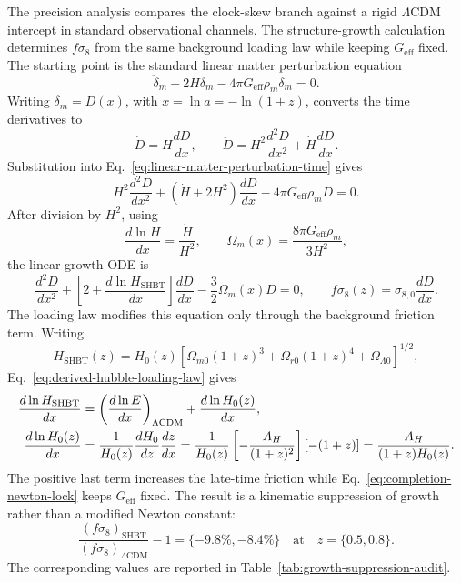 \documentclass[11pt,letterpaper]{article}
\theoremstyle{plain}
\newcommand{\lcdm}{\ensuremath{\Lambda\mathrm{CDM}}}
\newcommand{\AH}{A_H}
\begin{document}
The precision analysis compares the clock-skew branch against a rigid
\lcdm{} intercept in standard observational channels.  The structure-growth
calculation determines \(f\sigma_8\) from the same background loading law while keeping
\(G_{\text{eff}}\) fixed.  The starting point is the standard linear matter
perturbation equation
\begin{equation}
\label{eq:linear-matter-perturbation-time}
 \ddot\delta_m+2H\dot\delta_m
 -4\pi G_{\text{eff}}\rho_m\delta_m=0.
\end{equation}
Writing \(\delta_m=D(x)\), with \(x=\ln a=-\ln(1+z)\), converts the time
derivatives to
\begin{equation}
\label{eq:growth-time-derivative-conversion}
 \dot D
 =
 H\frac{dD}{dx},
 \qquad
 \ddot D
 =
 H^2\frac{d^2D}{dx^2}
 +
 \dot H\frac{dD}{dx}.
\end{equation}
Substitution into Eq.~\eqref{eq:linear-matter-perturbation-time} gives
\begin{equation}
\label{eq:growth-before-omega-substitution}
 H^2\frac{d^2D}{dx^2}
 +
 \left(\dot H+2H^2\right)\frac{dD}{dx}
 -
 4\pi G_{\text{eff}}\rho_mD
 =
 0.
\end{equation}
After division by \(H^2\), using
\[
 \frac{d\ln H}{dx}=\frac{\dot H}{H^2},
 \qquad
 \Omega_m(x)=\frac{8\pi G_{\text{eff}}\rho_m}{3H^2},
\]
the linear growth ODE is
\begin{equation}
\label{eq:growth-equation-loading}
 \boxed{
 \frac{d^2D}{dx^2}
 +
 \left[
  2+\frac{d\ln H_{\text{SHBT}}}{dx}
 \right]
 \frac{dD}{dx}
 -
 \frac{3}{2}\Omega_m(x)D
 =
 0,
 \qquad
 f\sigma_8(z)=\sigma_{8,0}\frac{dD}{dx}.
 }
\end{equation}
The loading law modifies this equation only through the background friction
term.  Writing
\begin{equation}
\label{eq:loaded-background-hubble}
 H_{\text{SHBT}}(z)
 =
 H_0(z)
 \left[
 \Omega_{m0}(1+z)^3+\Omega_{r0}(1+z)^4+\Omega_{\Lambda0}
 \right]^{1/2},
\end{equation}
Eq.~\eqref{eq:derived-hubble-loading-law} gives
\begin{align}
\label{eq:growth-friction-shift}
 \frac{d\ln H_{\text{SHBT}}}{dx}
 &=
 \left(\frac{d\ln E}{dx}\right)_{\lcdm}
 +
 \frac{d\ln H_0(z)}{dx},
 \notag\\
 \frac{d\ln H_0(z)}{dx}
 &=
 \frac{1}{H_0(z)}
 \frac{dH_0}{dz}
 \frac{dz}{dx}
 =
 \frac{1}{H_0(z)}
 \left[-\frac{\AH}{(1+z)^2}\right]
 \left[-(1+z)\right]
 =
 \frac{\AH}{(1+z)H_0(z)}.
\end{align}
The positive last term increases the late-time friction while
Eq.~\eqref{eq:completion-newton-lock} keeps \(G_{\text{eff}}\) fixed.  The result
is a kinematic suppression of growth rather than a modified Newton constant:
\begin{equation}
\label{eq:growth-suppression-summary}
 \frac{(f\sigma_8)_{\text{SHBT}}}{(f\sigma_8)_{\lcdm}}-1
 =
 \{-9.8\%, -8.4\%\}
 \quad
 \text{at}\quad
 z=\{0.5,0.8\}.
\end{equation}
The corresponding values are reported in
Table~\ref{tab:growth-suppression-audit}.
\end{document}
